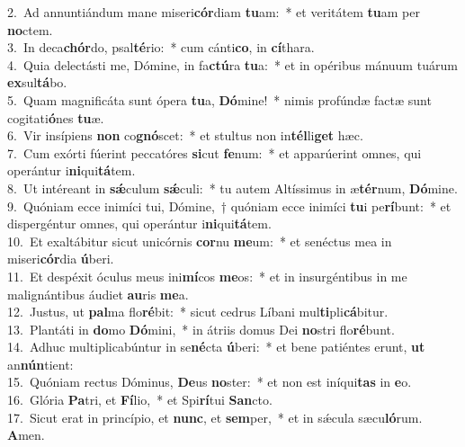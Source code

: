 {2.~}Ad annuntiándum mane miseri\textbf{cór}diam \textbf{tu}am:~* et veritátem \textbf{tu}am per \textbf{no}ctem.\\
{3.~}In deca\textbf{chór}do, psal\textbf{té}rio:~* cum cánti\textbf{co}, in \textbf{cí}thara.\\
{4.~}Quia delectásti me, Dómine, in fa\textbf{ctú}ra \textbf{tu}a:~* et in opéribus mánuum tuárum \textbf{ex}sul\textbf{tá}bo.\\
{5.~}Quam magnificáta sunt ópera \textbf{tu}a, \textbf{Dó}mine!~* nimis profúndæ factæ sunt cogitati\textbf{ó}nes \textbf{tu}æ.\\
{6.~}Vir insípiens \textbf{non} co\textbf{gnó}scet:~* et stultus non in\textbf{tél}li\textbf{get} hæc.\\
{7.~}Cum exórti fúerint peccatóres \textbf{si}cut \textbf{fe}num:~* et apparúerint omnes, qui operántur i\textbf{ni}qui\textbf{tá}tem.\\
{8.~}Ut intéreant in \textbf{sǽ}culum \textbf{sǽ}culi:~* tu autem Altíssimus in æ\textbf{tér}num, \textbf{Dó}mine.\\
{9.~}Quóniam ecce inimíci tui, Dómine,~† quóniam ecce inimíci \textbf{tu}i pe\textbf{rí}bunt:~* et dispergéntur omnes, qui operántur i\textbf{ni}qui\textbf{tá}tem.\\
{10.~}Et exaltábitur sicut unicórnis \textbf{cor}nu \textbf{me}um:~* et senéctus mea in miseri\textbf{cór}dia \textbf{ú}beri.\\
{11.~}Et despéxit óculus meus ini\textbf{mí}cos \textbf{me}os:~* et in insurgéntibus in me malignántibus áudiet \textbf{au}ris \textbf{me}a.\\
{12.~}Justus, ut \textbf{pal}ma flo\textbf{ré}bit:~* sicut cedrus Líbani mul\textbf{ti}pli\textbf{cá}bitur.\\
{13.~}Plantáti in \textbf{do}mo \textbf{Dó}mini,~* in átriis domus Dei \textbf{no}stri flo\textbf{ré}bunt.\\
{14.~}Adhuc multiplicabúntur in se\textbf{né}cta \textbf{ú}beri:~* et bene patiéntes erunt, \textbf{ut} an\textbf{nún}tient:\\
{15.~}Quóniam rectus Dóminus, \textbf{De}us \textbf{no}ster:~* et non est iníqui\textbf{tas} in \textbf{e}o.\\
{16.~}Glória \textbf{Pa}tri, et \textbf{Fí}lio,~* et Spi\textbf{rí}tui \textbf{San}cto.\\
{17.~}Sicut erat in princípio, et \textbf{nunc}, et \textbf{sem}per,~* et in sǽcula sæcu\textbf{ló}rum. \textbf{A}men.\\
